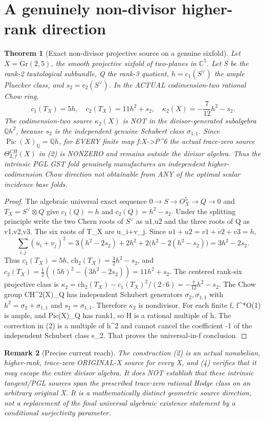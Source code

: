 \documentclass[11pt]{article}
\newtheorem{theorem}{Theorem}
\newtheorem{remark}[theorem]{Remark}
\begin{document}
\section{A genuinely non-divisor higher-rank direction}
\begin{theorem}[Exact non-divisor projective source on a genuine sixfold]
Let $X=\mathrm{Gr}(2,5)$, the smooth
projective sixfold of two-planes
in $\mathbb C^5$. Let S be the rank-2
tautological subbundle, Q the rank-3
quotient, $h=c_1(S^\vee)$ the ample
Pluecker class, and $s_2=c_2(S^\vee)$.
In the ACTUAL codimension-two
rational Chow ring,
\[
 \boxed{
 c_1(T_X)=5h,\quad
 c_2(T_X)=11h^2+s_2,\quad
 \kappa_2(X)=-\frac7{12}h^2-s_2.}             \tag{4}
\]
The codimension-two source
$\kappa_2(X)$ is NOT in the
divisor-generated subalgebra
$\mathbb Q h^2$, because $s_2$
is the independent genuine Schubert
class $\sigma_{1,1}$.
Since $\operatorname{Pic}(X)_{\mathbb Q}=\mathbb Q h$,
for EVERY finite map f:X->P^6
the actual trace-zero source
$\Theta_{2,f}^{CH}(X)$ in (2)
is NONZERO and remains outside
the divisor algebra.
Thus the intrinsic PGL GST fold
genuinely manufactures an
independent higher-codimension
Chow direction not obtainable
from ANY of the optimal
scalar incidence base folds.
\end{theorem}
\begin{proof}
The algebraic universal exact sequence
$0\to S\to O_X^5\to Q\to0$
and $T_X=S^\vee\otimes Q$ give
$c_1(Q)=h$ and $c_2(Q)=h^2-s_2$.
Under the splitting principle write
the two Chern roots of $S^\vee$ as
u1,u2 and the three roots of Q as
v1,v2,v3. The six roots of T_X
are u_i+v_j. Since
$u1+u2=v1+v2+v3=h$,
\[
 \sum_{i,j}(u_i+v_j)^2
 =3(h^2-2s_2)+2h^2+
       2\bigl(h^2-2(h^2-s_2)\bigr)
 =3h^2-2s_2.
\]
Thus $c_1(T_X)=5h$,
$\mathrm{ch}_2(T_X)=\tfrac32h^2-s_2$,
and
$c_2(T_X)=\tfrac12((5h)^2-(3h^2-2s_2))
 =11h^2+s_2$.
The centered rank-six projective
class is
$\kappa_2=\mathrm{ch}_2(T_X)
-c_1(T_X)^2/(2\cdot6)
=-\tfrac7{12}h^2-s_2$.
The Chow group CH^2(X)_Q has
independent Schubert generators
$\sigma_2,\sigma_{1,1}$ with
$h^2=\sigma_2+\sigma_{1,1}$
and $s_2=\sigma_{1,1}$.
Therefore $\kappa_2$ is nondivisor.
For each finite f, f^*O(1) is
ample, and Pic(X)_Q has rank1,
so H is a rational multiple of h.
The correction in (2) is a
multiple of h^2 and cannot
cancel the coefficient -1
of the independent Schubert
class s_2. That proves the
universal-in-f conclusion.
\end{proof}

\begin{remark}[Precise current reach]
The construction (2) is an actual
nonabelian, higher-rank,
trace-zero ORIGINAL-X source for
every X, and (4) verifies that it
may escape the entire divisor algebra.
It does NOT establish that these
intrinsic tangent/PGL sources
span the prescribed trace-zero
rational Hodge class on an
arbitrary original X.
It is a mathematically distinct
geometric source direction,
not a replacement of the final
universal algebraic existence
statement by a conditional
surjectivity parameter.
\end{remark}
\end{document}
